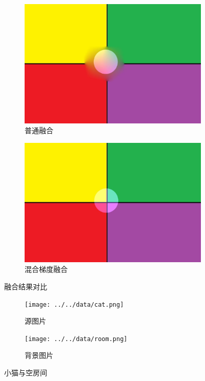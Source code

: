 \documentclass[11pt,a4paper]{article}
\begin{document}
		\begin{figure}[ht]
			\centering
			\begin{subfigure}[htbp]{0.45\textwidth}
				\includegraphics[width=\textwidth]{../../result/result_20.jpg}
				\caption{普通融合}
			\end{subfigure}
			\begin{subfigure}[htbp]{0.45\textwidth}
				\includegraphics[width=\textwidth]{../../result/result_21.jpg}
				\caption{混合梯度融合}
			\end{subfigure}
			\caption{融合结果对比}
		\end{figure}

		\begin{figure}[ht]
			\centering
			\begin{subfigure}[htbp]{0.45\textwidth}
				\texttt{[image: ../../data/cat.png]}
				\caption{源图片}
			\end{subfigure}
			\begin{subfigure}[htbp]{0.45\textwidth}
				\texttt{[image: ../../data/room.png]}
				\caption{背景图片}
			\end{subfigure}
			\caption{小猫与空房间}
		\end{figure}
\end{document}
